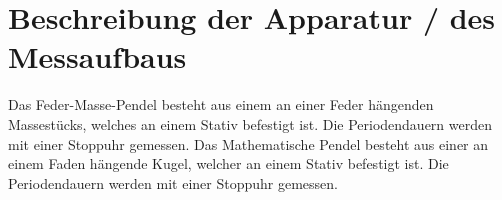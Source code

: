 \section{Beschreibung der Apparatur / des Messaufbaus}
Das Feder-Masse-Pendel besteht aus einem an einer Feder hängenden Massestücks, welches an einem Stativ befestigt ist. Die Periodendauern werden mit einer Stoppuhr gemessen. 
\newline
\newline
Das Mathematische Pendel besteht aus einer an einem Faden hängende Kugel, welcher an einem Stativ befestigt ist. Die Periodendauern werden mit einer Stoppuhr gemessen.